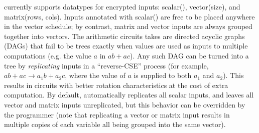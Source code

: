 \system currently supports datatypes for encrypted inputs: {\sf scalar()}, {\sf vector(size)}, and {\sf matrix(rows, cols)}.
Inputs annotated with {\sf scalar()} are free to be placed anywhere in the vector schedule; by contrast, {\sf matrix} and {\sf vector} inputs are always grouped together into vectors. %
The arithmetic circuits \system takes are directed acyclic graphs (DAGs) that fail to be trees exactly when values are used as inputs to multiple computations (e.g. the value $a$ in $ab + ac$).
Any such DAG can  be turned into a tree by {\em replicating} inputs in a ``reverse-CSE'' process (for example, $ab + ac \to a_1b + a_2c$, where the value of $a$ is supplied to both $a_1$ and $a_2$).
This results in circuits with better rotation characteristics at the cost of extra computation.
By default, \system automatically replicates all {\sf scalar} inputs, and leaves all {\sf vector} and {\sf matrix} inputs unreplicated, but this behavior can be overridden by the programmer (note that replicating a {\sf vector} or {\sf matrix} input results in multiple copies of each variable all being grouped into the same vector). %

